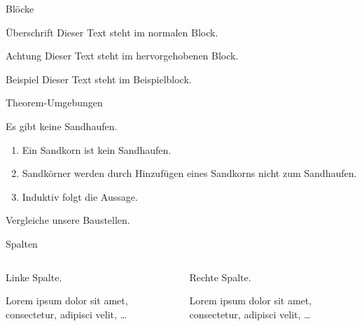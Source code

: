 \documentclass{beamer}
\begin{document}
  \begin{frame}{Blöcke}
    \begin{block}{Überschrift}
      Dieser Text steht im normalen Block.
    \end{block}

    \begin{alertblock}{Achtung}
      Dieser Text steht im hervorgehobenen Block.
    \end{alertblock}

    \begin{exampleblock}{Beispiel}
      Dieser Text steht im Beispielblock.
    \end{exampleblock}
  \end{frame}

  \begin{frame}{Theorem-Umgebungen}
    \begin{Satz}[Sandhaufensatz]
      Es gibt keine Sandhaufen.
    \end{Satz}

    \begin{Beweis}
      \begin{enumerate}
        \item Ein Sandkorn ist kein Sandhaufen.
        \item Sandkörner werden durch Hinzufügen
          eines Sandkorns nicht zum Sandhaufen.
        \item Induktiv folgt die Aussage. \qedhere
      \end{enumerate}
    \end{Beweis}

    \begin{Beispiel}
      Vergleiche unsere Baustellen.
    \end{Beispiel}
  \end{frame}

  \begin{frame}{Spalten}
    \begin{columns}
      \begin{column}{5cm}
        Linke Spalte.

        Lorem ipsum dolor sit amet, consectetur, adipisci velit, \ldots
      \end{column}
      \begin{column}{5cm}
        Rechte Spalte.

        Lorem ipsum dolor sit amet, consectetur, adipisci velit, \ldots
      \end{column}
    \end{columns}
  \end{frame}
\end{document}
